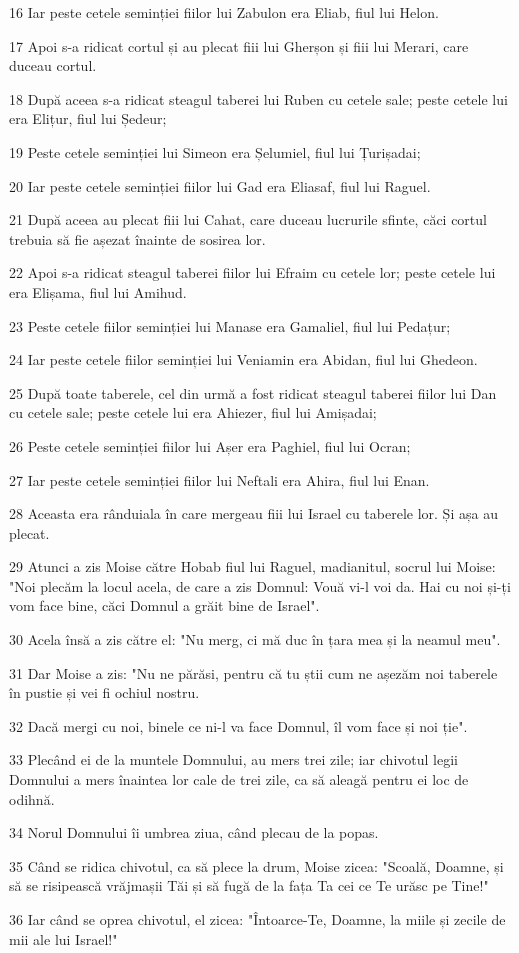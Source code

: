 \par 16 Iar peste cetele seminției fiilor lui Zabulon era Eliab, fiul lui Helon.
\par 17 Apoi s-a ridicat cortul și au plecat fiii lui Gherșon și fiii lui Merari, care duceau cortul.
\par 18 După aceea s-a ridicat steagul taberei lui Ruben cu cetele sale; peste cetele lui era Elițur, fiul lui Ședeur;
\par 19 Peste cetele seminției lui Simeon era Șelumiel, fiul lui Țurișadai;
\par 20 Iar peste cetele seminției fiilor lui Gad era Eliasaf, fiul lui Raguel.
\par 21 După aceea au plecat fiii lui Cahat, care duceau lucrurile sfinte, căci cortul trebuia să fie așezat înainte de sosirea lor.
\par 22 Apoi s-a ridicat steagul taberei fiilor lui Efraim cu cetele lor; peste cetele lui era Elișama, fiul lui Amihud.
\par 23 Peste cetele fiilor seminției lui Manase era Gamaliel, fiul lui Pedațur;
\par 24 Iar peste cetele fiilor seminției lui Veniamin era Abidan, fiul lui Ghedeon.
\par 25 După toate taberele, cel din urmă a fost ridicat steagul taberei fiilor lui Dan cu cetele sale; peste cetele lui era Ahiezer, fiul lui Amișadai;
\par 26 Peste cetele seminției fiilor lui Așer era Paghiel, fiul lui Ocran;
\par 27 Iar peste cetele seminției fiilor lui Neftali era Ahira, fiul lui Enan.
\par 28 Aceasta era rânduiala în care mergeau fiii lui Israel cu taberele lor. Și așa au plecat.
\par 29 Atunci a zis Moise către Hobab fiul lui Raguel, madianitul, socrul lui Moise: "Noi plecăm la locul acela, de care a zis Domnul: Vouă vi-l voi da. Hai cu noi și-ți vom face bine, căci Domnul a grăit bine de Israel".
\par 30 Acela însă a zis către el: "Nu merg, ci mă duc în țara mea și la neamul meu".
\par 31 Dar Moise a zis: "Nu ne părăsi, pentru că tu știi cum ne așezăm noi taberele în pustie și vei fi ochiul nostru.
\par 32 Dacă mergi cu noi, binele ce ni-l va face Domnul, îl vom face și noi ție".
\par 33 Plecând ei de la muntele Domnului, au mers trei zile; iar chivotul legii Domnului a mers înaintea lor cale de trei zile, ca să aleagă pentru ei loc de odihnă.
\par 34 Norul Domnului îi umbrea ziua, când plecau de la popas.
\par 35 Când se ridica chivotul, ca să plece la drum, Moise zicea: "Scoală, Doamne, și să se risipească vrăjmașii Tăi și să fugă de la fața Ta cei ce Te urăsc pe Tine!"
\par 36 Iar când se oprea chivotul, el zicea: "Întoarce-Te, Doamne, la miile și zecile de mii ale lui Israel!"

